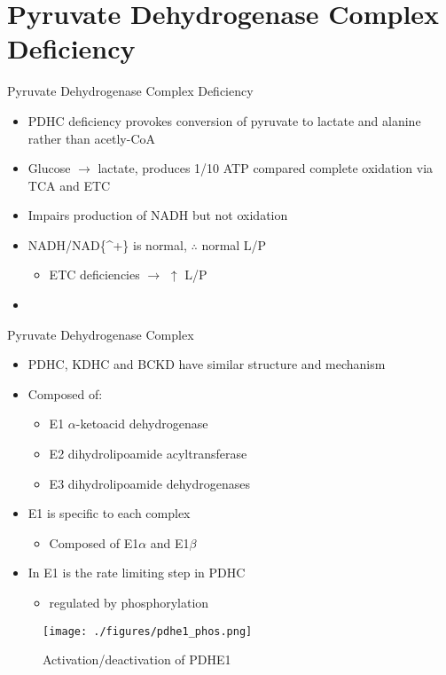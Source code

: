 \documentclass[presentation, smaller]{beamer}
\begin{document}
\section{Pyruvate Dehydrogenase Complex Deficiency}
\label{sec:org9033998}
\begin{frame}[label={sec:orgaee470b}]{Pyruvate Dehydrogenase Complex Deficiency}
\begin{itemize}
\item PDHC deficiency provokes conversion of pyruvate to lactate and alanine rather than acetly-CoA
\item Glucose \(\to\) lactate, produces 1/10 ATP compared complete oxidation via TCA and ETC
\item Impairs production of NADH but not oxidation
\item NADH/NAD\{\^{}+\} is normal, \(\therefore\) normal L/P
\begin{itemize}
\item ETC deficiencies \(\to\) \(\uparrow\) L/P
\end{itemize}
\item 
\end{itemize}
\end{frame}
\begin{frame}[label={sec:orgfef5b2f}]{Pyruvate Dehydrogenase Complex}
\begin{itemize}
\item PDHC, KDHC and BCKD have similar structure and mechanism
\item Composed of:
\begin{itemize}
\item E1 \(\alpha\)-ketoacid dehydrogenase
\item E2 dihydrolipoamide acyltransferase
\item E3 dihydrolipoamide dehydrogenases
\end{itemize}
\item E1 is specific to each complex
\begin{itemize}
\item Composed of E1\(\alpha\) and E1\(\beta\)
\end{itemize}
\item In E1 is the rate limiting step in PDHC
\begin{itemize}
\item regulated by phosphorylation
\end{itemize}
\end{itemize}

\begin{figure}[htbp]
\centering
\texttt{[image: ./figures/pdhe1\_phos.png]}
\caption[pdhe1]{\label{fig:orgd2d1e60}
Activation/deactivation of PDHE1}
\end{figure}
\end{frame}
\end{document}
